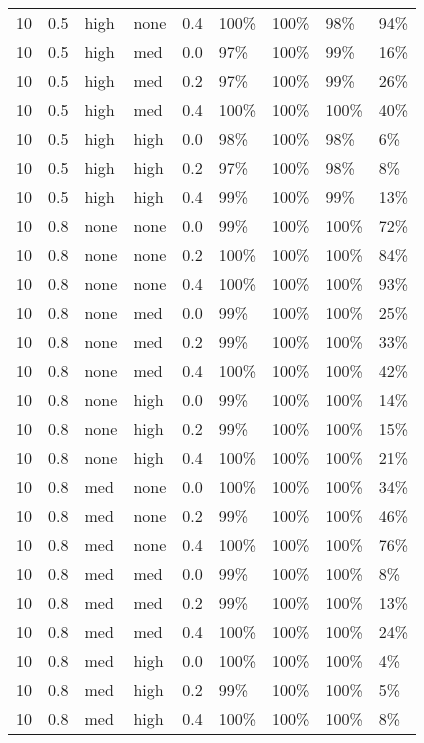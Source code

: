 \begin{longtable}{rrllrllll}
  10 & 0.5 & high & none & 0.4 & 100\% & 100\% & 98\% & 94\% \\ 
  10 & 0.5 & high & med & 0.0 & 97\% & 100\% & 99\% & 16\% \\ 
  10 & 0.5 & high & med & 0.2 & 97\% & 100\% & 99\% & 26\% \\ 
  10 & 0.5 & high & med & 0.4 & 100\% & 100\% & 100\% & 40\% \\ 
  10 & 0.5 & high & high & 0.0 & 98\% & 100\% & 98\% & 6\% \\ 
  10 & 0.5 & high & high & 0.2 & 97\% & 100\% & 98\% & 8\% \\ 
  10 & 0.5 & high & high & 0.4 & 99\% & 100\% & 99\% & 13\% \\ 
  10 & 0.8 & none & none & 0.0 & 99\% & 100\% & 100\% & 72\% \\ 
  10 & 0.8 & none & none & 0.2 & 100\% & 100\% & 100\% & 84\% \\ 
  10 & 0.8 & none & none & 0.4 & 100\% & 100\% & 100\% & 93\% \\ 
  10 & 0.8 & none & med & 0.0 & 99\% & 100\% & 100\% & 25\% \\ 
  10 & 0.8 & none & med & 0.2 & 99\% & 100\% & 100\% & 33\% \\ 
  10 & 0.8 & none & med & 0.4 & 100\% & 100\% & 100\% & 42\% \\ 
  10 & 0.8 & none & high & 0.0 & 99\% & 100\% & 100\% & 14\% \\ 
  10 & 0.8 & none & high & 0.2 & 99\% & 100\% & 100\% & 15\% \\ 
  10 & 0.8 & none & high & 0.4 & 100\% & 100\% & 100\% & 21\% \\ 
  10 & 0.8 & med & none & 0.0 & 100\% & 100\% & 100\% & 34\% \\ 
  10 & 0.8 & med & none & 0.2 & 99\% & 100\% & 100\% & 46\% \\ 
  10 & 0.8 & med & none & 0.4 & 100\% & 100\% & 100\% & 76\% \\ 
  10 & 0.8 & med & med & 0.0 & 99\% & 100\% & 100\% & 8\% \\ 
  10 & 0.8 & med & med & 0.2 & 99\% & 100\% & 100\% & 13\% \\ 
  10 & 0.8 & med & med & 0.4 & 100\% & 100\% & 100\% & 24\% \\ 
  10 & 0.8 & med & high & 0.0 & 100\% & 100\% & 100\% & 4\% \\ 
  10 & 0.8 & med & high & 0.2 & 99\% & 100\% & 100\% & 5\% \\ 
  10 & 0.8 & med & high & 0.4 & 100\% & 100\% & 100\% & 8\% \\ 

\end{longtable}
